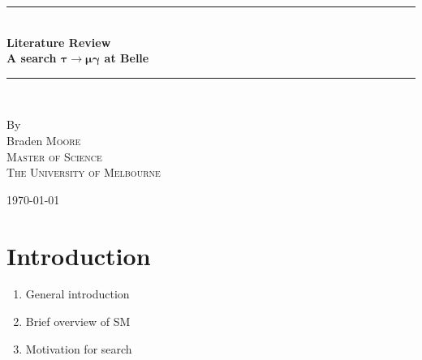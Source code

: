 \documentclass[a4paper]{article} %
\begin{document}
\pagestyle{empty}

\newcommand{\HRule}{\rule{\linewidth}{0.5mm}}

\begin{titlepage}

    \begin{center}
        \vspace*{5cm}

        \HRule \\[0.75cm]
        \huge \textbf{Literature Review} \\[0.5cm]
		\Huge \textbf{A search $\bm{\tau\to\mu \gamma}$ at Belle}\\[0.5cm]
        \HRule \\[1.5cm]
        \begin{minipage}{0.4\textwidth}
        \begin{center}

        \large By \\[0.75cm]
        \huge Braden \scshape Moore \\[0.5cm]
        \normalsize \normalfont Master of Science \\
        The University of Melbourne \\

        \end{center}
        \end{minipage}

        \vfill

        \large \today
    \end{center}


\newpage
\end{titlepage}
\pagestyle{empty}
\tableofcontents
\newpage

\pagestyle{fancy}
\lfoot{\textsc{\today}}
\setcounter{page}{1}
\section{Introduction}
\begin{enumerate}
\item General introduction
\item Brief overview of SM
\item Motivation for search
\end{enumerate}
\end{document}
